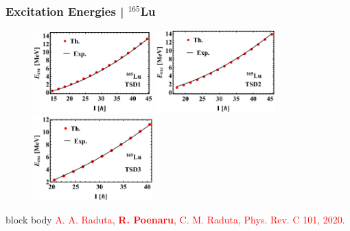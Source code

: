 \documentclass{beamer}
\begin{document}
\begin{frame}
	\frametitle{Excitation Energies | $^{165}$Lu}
	\vspace{-0.2cm}
	\begin{figure}
		\centering
		\includegraphics[width=0.41\textwidth]{figures/Lu-exp-energies/fig4a_lu165.pdf}
		\includegraphics[width=0.41\textwidth]{figures/Lu-exp-energies/fig4b_lu165.pdf}
		\includegraphics[width=0.41\textwidth]{figures/Lu-exp-energies/fig4c_lu165.pdf}
	\end{figure}
	\vspace{-0.2cm}
	\begin{beamercolorbox}[rounded=true,shadow=false, wd=\linewidth,]{block body}
		\centering
		\textcolor{red}{\footnotesize{A. A. Raduta, \textbf{R. Poenaru}, C. M. Raduta, Phys. Rev. C 101, 2020.}}
	\end{beamercolorbox}
\end{frame}
\end{document}
